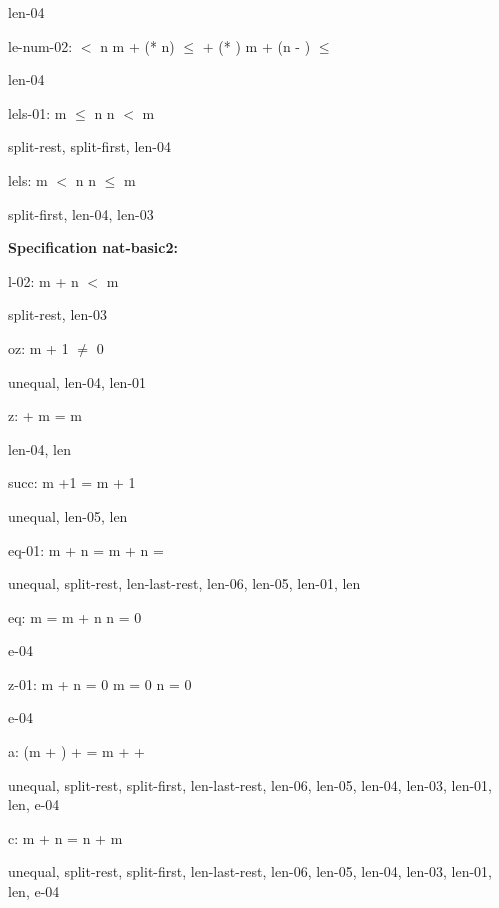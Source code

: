 \documentclass[a4paper]{article}
\begin{document}
len-04

\bigskip

le-num-02: 
 $<$ n
 \Fol m + (* n) $\le$  + (* ) \Equiv m + (n - ) $\le$ 



len-04

\bigskip

lels-01: 
 \Fol \Not m $\le$ n \Equiv n $<$ m



split-rest, split-first, len-04

\bigskip

lels: 
 \Fol \Not m $<$ n \Equiv n $\le$ m



split-first, len-04, len-03

\bigskip

{\bf Specification nat-basic2:}

l-02: 
 \Fol \Not m + n $<$ m



split-rest, len-03

\bigskip

oz: 
 \Fol m + 1 $\neq$ 0



unequal, len-04, len-01

\bigskip

z: 
  + m = m



len-04, len

\bigskip

succ: 
 \Fol m +1 = m + 1



unequal, len-05, len

\bigskip

eq-01: 
 \Fol m + n = m +  \Equiv n = 



unequal, split-rest, len-last-rest, len-06, len-05, len-01, len

\bigskip

eq: 
 \Fol m = m + n \Equiv n = 0



e-04

\bigskip

z-01: 
 \Fol m + n = 0 \Equiv m = 0 \And n = 0



e-04

\bigskip

a: 
 \Fol (m + ) +  = m +  + 



unequal, split-rest, split-first, len-last-rest, len-06, len-05, len-04, len-03, len-01, len, e-04

\bigskip

c: 
 \Fol m + n = n + m



unequal, split-rest, split-first, len-last-rest, len-06, len-05, len-04, len-03, len-01, len, e-04

\bigskip
\end{document}
